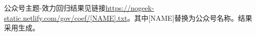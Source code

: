 \documentclass[a4paper,12pt,UTF8]{article}
\begin{document}
    公众号主题-效力回归结果见链接\url{https://nogeek-static.netlify.com/gov/coef/[NAME].txt}。其中[NAME]替换为公众号名称。结果采用\cite{stargazer}生成。

    \label{applastpage}
    \newpage
    
    

\end{document}
